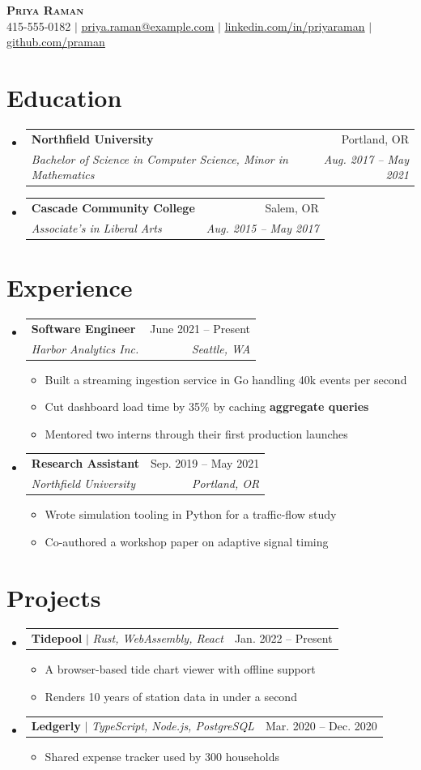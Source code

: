 \documentclass[letterpaper,11pt]{article}
\makeatletter
\newcommand{\resumeItem}[1]{
  \item\small{
    {#1 \vspace{-2pt}}
  }
}
\newcommand{\resumeSubheading}[4]{
  \vspace{-2pt}\item
    \begin{tabular*}{0.97\textwidth}[t]{l@{\extracolsep{\fill}}r}
      \textbf{#1} & #2 \\
      \textit{\small#3} & \textit{\small #4} \\
    \end{tabular*}\vspace{-7pt}
}
\newcommand{\resumeProjectHeading}[2]{
    \item
    \begin{tabular*}{0.97\textwidth}{l@{\extracolsep{\fill}}r}
      \small#1 & #2 \\
    \end{tabular*}\vspace{-7pt}
}
\newcommand{\resumeSubHeadingListStart}{\begin{itemize}[leftmargin=0.15in, label={}]}
\newcommand{\resumeSubHeadingListEnd}{\end{itemize}}
\newcommand{\resumeItemListStart}{\begin{itemize}}
\newcommand{\resumeItemListEnd}{\end{itemize}\vspace{-5pt}}
\makeatother
\begin{document}
\begin{center}
    \textbf{\Huge \scshape Priya Raman} \\ \vspace{1pt}
    \small 415-555-0182 $|$ \href{mailto:priya.raman@example.com}{\underline{priya.raman@example.com}} $|$
    \href{https://linkedin.com/in/priyaraman}{\underline{linkedin.com/in/priyaraman}} $|$
    \href{https://github.com/praman}{\underline{github.com/praman}}
\end{center}

\section{Education}
  \resumeSubHeadingListStart
    \resumeSubheading
      {Northfield University}{Portland, OR}
      {Bachelor of Science in Computer Science, Minor in Mathematics}{Aug. 2017 -- May 2021}
    \resumeSubheading
      {Cascade Community College}{Salem, OR}
      {Associate's in Liberal Arts}{Aug. 2015 -- May 2017}
  \resumeSubHeadingListEnd

\section{Experience}
  \resumeSubHeadingListStart

    \resumeSubheading
      {Software Engineer}{June 2021 -- Present}
      {Harbor Analytics Inc.}{Seattle, WA}
      \resumeItemListStart
        \resumeItem{Built a streaming ingestion service in Go handling 40k events per second}
        \resumeItem{Cut dashboard load time by 35\% by caching \textbf{aggregate queries}}
        \resumeItem{Mentored two interns through their first production launches}
      \resumeItemListEnd

    \resumeSubheading
      {Research Assistant}{Sep. 2019 -- May 2021}
      {Northfield University}{Portland, OR}
      \resumeItemListStart
        \resumeItem{Wrote simulation tooling in Python for a traffic-flow study}
        \resumeItem{Co-authored a workshop paper on adaptive signal timing}
      \resumeItemListEnd

  \resumeSubHeadingListEnd

\section{Projects}
    \resumeSubHeadingListStart
      \resumeProjectHeading
          {\textbf{Tidepool} $|$ \emph{Rust, WebAssembly, React}}{Jan. 2022 -- Present}
          \resumeItemListStart
            \resumeItem{A browser-based tide chart viewer with offline support}
            \resumeItem{Renders 10 years of station data in under a second}
          \resumeItemListEnd
      \resumeProjectHeading
          {\textbf{Ledgerly} $|$ \emph{TypeScript, Node.js, PostgreSQL}}{Mar. 2020 -- Dec. 2020}
          \resumeItemListStart
            \resumeItem{Shared expense tracker used by 300 households}
          \resumeItemListEnd
    \resumeSubHeadingListEnd
\end{document}
